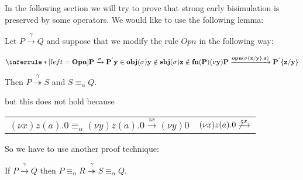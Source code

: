 
In the following section we will try to prove that strong early bisimulation is preserved by some operators. We would like to use the following lemma:
\begin{example}
  Let $P \xrightarrow{\gamma} Q$ and suppose that we modify the rule $Opn$ in the following way:
  \begin{center}
	  $\inferrule* [left=\bf{Opn}]{
	      P \xrightarrow{\sigma} P^{'}
	    \\
	      y \in obj(\sigma)
	    \\
	      y \notin sbj(\sigma)
	    \\
	      z \notin fn(P)
	  }{
	    (\nu y)P \xrightarrow{opn(\sigma\{z/y\}, z)} P^{'}\{z/y\}
	  }$    
  \end{center}
  Then $P \stackrel{\gamma}{\twoheadrightarrow} S$ and $S\equiv_{\alpha} Q$.
\end{example}
but this does not hold because
\begin{center}
  \begin{tabular}{ll}
      $(\nu x) z(a).0 \equiv_{\alpha} (\nu y) z(a).0 \xrightarrow{zx} (\nu y)0$
    &
      $(\nu x) z(a).0 \not \xrightarrow{zx} $
  \end{tabular}
\end{center}

So we have to use another proof technique:
\begin{lemma}\label{moveAlpDown}
  If $P \xrightarrow{\gamma} Q$ then $P\equiv_{\alpha}R \stackrel{\gamma}{\twoheadrightarrow} S\equiv_{\alpha}Q$.
\end{lemma}


